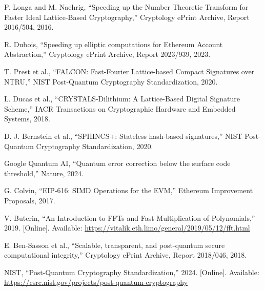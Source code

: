 \documentclass[11pt,a4paper]{article}
\begin{document}
\begin{thebibliography}{99}

P. Longa and M. Naehrig, ``Speeding up the Number Theoretic Transform for Faster Ideal Lattice-Based Cryptography,'' Cryptology ePrint Archive, Report 2016/504, 2016.

R. Dubois, ``Speeding up elliptic computations for Ethereum Account Abstraction,'' Cryptology ePrint Archive, Report 2023/939, 2023.

T. Prest et al., ``FALCON: Fast-Fourier Lattice-based Compact Signatures over NTRU,'' NIST Post-Quantum Cryptography Standardization, 2020.

L. Ducas et al., ``CRYSTALS-Dilithium: A Lattice-Based Digital Signature Scheme,'' IACR Transactions on Cryptographic Hardware and Embedded Systems, 2018.

D. J. Bernstein et al., ``SPHINCS+: Stateless hash-based signatures,'' NIST Post-Quantum Cryptography Standardization, 2020.

Google Quantum AI, ``Quantum error correction below the surface code threshold,'' Nature, 2024.

G. Colvin, ``EIP-616: SIMD Operations for the EVM,'' Ethereum Improvement Proposals, 2017.

V. Buterin, ``An Introduction to FFTs and Fast Multiplication of Polynomials,'' 2019. [Online]. Available: \url{https://vitalik.eth.limo/general/2019/05/12/fft.html}

E. Ben-Sasson et al., ``Scalable, transparent, and post-quantum secure computational integrity,'' Cryptology ePrint Archive, Report 2018/046, 2018.

NIST, ``Post-Quantum Cryptography Standardization,'' 2024. [Online]. Available: \url{https://csrc.nist.gov/projects/post-quantum-cryptography}

\end{thebibliography}
\end{document}
